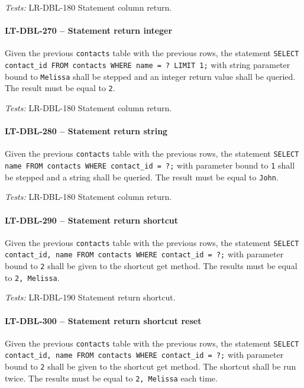 \textit{Tests: } LR-DBL-180 Statement column return.

\paragraph{LT-DBL-270 -- Statement return integer}
Given the previous \lstinline{contacts} table with the previous rows,
the statement
\lstinline{SELECT contact_id FROM contacts WHERE name = ? LIMIT 1;}
with string parameter bound to \lstinline{Melissa} shall be stepped
and an integer return value shall be queried. The result must be
equal to \lstinline{2}.

\textit{Tests: } LR-DBL-180 Statement column return.

\paragraph{LT-DBL-280 -- Statement return string}
Given the previous \lstinline{contacts} table with the previous rows,
the statement
\lstinline{SELECT name FROM contacts WHERE contact_id = ?;}
with parameter bound to \lstinline{1} shall be stepped and
a string shall be queried. The result must be equal to \lstinline{John}.

\textit{Tests: } LR-DBL-180 Statement column return.

\paragraph{LT-DBL-290 -- Statement return shortcut}
Given the previous \lstinline{contacts} table with the previous rows,
the statement
\lstinline{SELECT contact_id, name FROM contacts WHERE contact_id = ?;}
with parameter bound to \lstinline{2} shall be given to the
shortcut get method. The results must be equal to \lstinline{2, Melissa}.

\textit{Tests: } LR-DBL-190 Statement return shortcut.

\paragraph{LT-DBL-300 -- Statement return shortcut reset}
Given the previous \lstinline{contacts} table with the previous rows,
the statement
\lstinline{SELECT contact_id, name FROM contacts WHERE contact_id = ?;}
with parameter bound to \lstinline{2} shall be given to the
shortcut get method. The shortcut shall be run twice.
The results must be equal to \lstinline{2, Melissa} each time.

